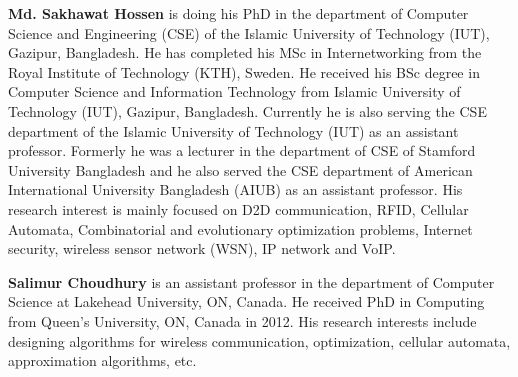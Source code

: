 \documentclass{ieeeaccess}
\begin{document}
\vspace{-45pt}
\begin{IEEEbiography}{\textbf{Md. Sakhawat Hossen}}  is doing his PhD in the department of Computer Science and Engineering (CSE) of the Islamic University of Technology (IUT), Gazipur, Bangladesh. He has completed his MSc in Internetworking from the Royal Institute of Technology (KTH), Sweden. He received his BSc degree in Computer Science and Information Technology from Islamic University of Technology (IUT), Gazipur, Bangladesh. Currently he is also serving the CSE department of the Islamic University of Technology (IUT) as an assistant professor. Formerly he was a lecturer in the department of CSE of Stamford University Bangladesh and
he also served the CSE department of American International University Bangladesh (AIUB) as an assistant professor. His research interest is mainly focused on D2D communication, RFID, Cellular Automata, Combinatorial and evolutionary optimization problems, Internet security, wireless sensor network (WSN), IP network and VoIP.
\end{IEEEbiography}

\vspace{-45pt}
\begin{IEEEbiography}{\textbf{Salimur Choudhury}}  is an assistant professor in the department of Computer Science at
Lakehead University, ON, Canada. He received PhD in Computing from Queen's University,
ON, Canada in 2012. His research interests include designing algorithms for wireless
communication, optimization, cellular automata, approximation algorithms, etc.
\end{IEEEbiography}
\end{document}
